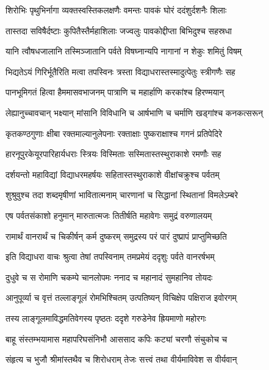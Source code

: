 \twolineshloka
{शिरोभिः पृथुभिर्नागा व्यक्तस्वस्तिकलक्षणैः}
{वमन्तः पावकं घोरं ददंशुर्दशनैः शिलाः} %

\twolineshloka
{तास्तदा सविषैर्दष्टाः कुपितैस्तैर्महाशिलाः}
{जज्वलुः पावकोद्दीप्ता बिभिदुश्च सहस्रधा} %

\twolineshloka
{यानि त्वौषधजालानि तस्मिञ्जातानि पर्वते}
{विषघ्नान्यपि नागानां न शेकुः शमितुं विषम्} %

\twolineshloka
{भिद्यतेऽयं गिरिर्भूतैरिति मत्वा तपस्विनः}
{त्रस्ता विद्याधरास्तस्मादुत्पेतुः स्त्रीगणैः सह} %

\twolineshloka
{पानभूमिगतं हित्वा हैममासवभाजनम्}
{पात्राणि च महार्हाणि करकांश्च हिरण्मयान्} %

\twolineshloka
{लेह्यानुच्चावचान् भक्ष्यान् मांसानि विविधानि च}
{आर्षभाणि च चर्माणि खड्गांश्च कनकत्सरून्} %

\twolineshloka
{कृतकण्ठगुणाः क्षीबा रक्तमाल्यानुलेपनाः}
{रक्ताक्षाः पुष्कराक्षाश्च गगनं प्रतिपेदिरे} %

\twolineshloka
{हारनूपुरकेयूरपारिहार्यधराः स्त्रियः}
{विस्मिताः सस्मितास्तस्थुराकाशे रमणौः सह} %

\twolineshloka
{दर्शयन्तो महाविद्यां विद्याधरमहर्षयः}
{सहितास्तस्थुराकाशे वीक्षांचक्रुश्च पर्वतम्} %

\twolineshloka
{शुश्रुवुश्च तदा शब्दमृषीणां भावितात्मनाम्}
{चारणानां च सिद्धानां स्थितानां विमलेऽम्बरे} %

\twolineshloka
{एष पर्वतसंकाशो हनुमान् मारुतात्मजः}
{तितीर्षति महावेगः समुद्रं वरुणालयम्} %

\twolineshloka
{रामार्थं वानरार्थं च चिकीर्षन् कर्म दुष्करम्}
{समुद्रस्य परं पारं दुष्प्रापं प्राप्तुमिच्छति} %

\twolineshloka
{इति विद्याधरा वाचः श्रुत्वा तेषां तपस्विनाम्}
{तमप्रमेयं ददृशुः पर्वते वानरर्षभम्} %

\twolineshloka
{दुधुवे च स रोमाणि चकम्पे चानलोपमः}
{ननाद च महानादं सुमहानिव तोयदः} %

\twolineshloka
{आनुपूर्व्या च वृत्तं तल्लाङ्गूलं रोमभिश्चितम्}
{उत्पतिष्यन् विचिक्षेप पक्षिराज इवोरगम्} %

\twolineshloka
{तस्य लाङ्गूलमाविद्धमतिवेगस्य पृष्ठतः}
{ददृशे गरुडेनेव ह्रियमाणो महोरगः} %

\twolineshloka
{बाहू संस्तम्भयामास महापरिघसंनिभौ}
{आससाद कपिः कट्यां चरणौ संचुकोच च} %

\twolineshloka
{संहृत्य च भुजौ श्रीमांस्तथैव च शिरोधराम्}
{तेजः सत्त्वं तथा वीर्यमाविवेश स वीर्यवान्} %

